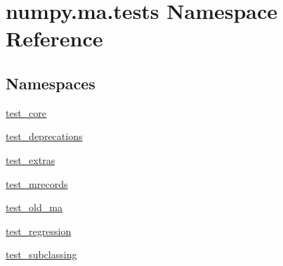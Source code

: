 \hypertarget{namespacenumpy_1_1ma_1_1tests}{}\section{numpy.\+ma.\+tests Namespace Reference}
\label{namespacenumpy_1_1ma_1_1tests}
\subsection*{Namespaces}
\begin{DoxyCompactItemize}
\item 
 \hyperlink{namespacenumpy_1_1ma_1_1tests_1_1test__core}{test\+\_\+core}
\item 
 \hyperlink{namespacenumpy_1_1ma_1_1tests_1_1test__deprecations}{test\+\_\+deprecations}
\item 
 \hyperlink{namespacenumpy_1_1ma_1_1tests_1_1test__extras}{test\+\_\+extras}
\item 
 \hyperlink{namespacenumpy_1_1ma_1_1tests_1_1test__mrecords}{test\+\_\+mrecords}
\item 
 \hyperlink{namespacenumpy_1_1ma_1_1tests_1_1test__old__ma}{test\+\_\+old\+\_\+ma}
\item 
 \hyperlink{namespacenumpy_1_1ma_1_1tests_1_1test__regression}{test\+\_\+regression}
\item 
 \hyperlink{namespacenumpy_1_1ma_1_1tests_1_1test__subclassing}{test\+\_\+subclassing}
\end{DoxyCompactItemize}
